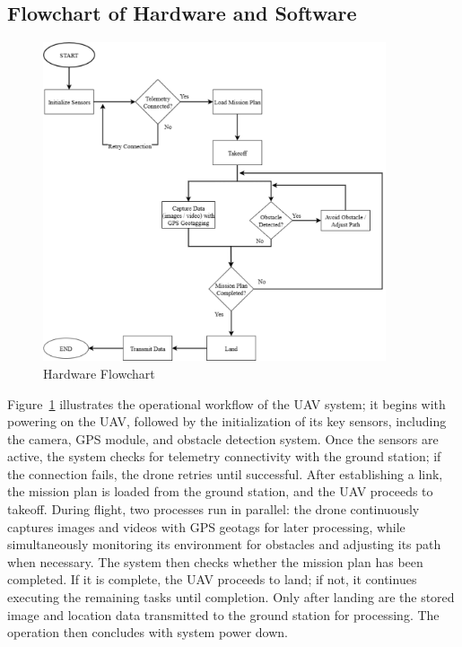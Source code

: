 \subsection*{Flowchart of Hardware and Software}

\begin{figure}[H]
	\centering
	\caption{Hardware Flowchart}
	\label{fig:HardFlow}
	\includegraphics[width=0.9\textwidth]{figures/Hard_Flow.pdf}
\end{figure}

Figure~\ref{fig:HardFlow} illustrates the operational workflow of the UAV system; it begins with powering on the UAV, followed by the initialization of its key sensors, including the camera, GPS module, and obstacle detection system. Once the sensors are active, the system checks for telemetry connectivity with the ground station; if the connection fails, the drone retries until successful. After establishing a link, the mission plan is loaded from the ground station, and the UAV proceeds to takeoff. During flight, two processes run in parallel: the drone continuously captures images and videos with GPS geotags for later processing, while simultaneously monitoring its environment for obstacles and adjusting its path when necessary. The system then checks whether the mission plan has been completed. If it is complete, the UAV proceeds to land; if not, it continues executing the remaining tasks until completion. Only after landing are the stored image and location data transmitted to the ground station for processing. The operation then concludes with system power down.

